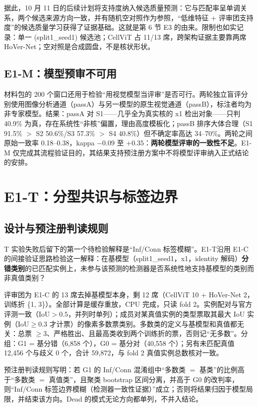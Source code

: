 \documentclass[11pt,a4paper,UTF8,fontset=fandol]{ctexart}
\begin{document}
据此，10 月 11 日的后续计划将支持度纳入候选质量预测：它与匹配率呈单调关系，两个候选来源方向一致，并有随机空对照作为参照，“低维特征 + 评审团支持度”的候选质量学习获得了证据基础。这就是第 6 节 E3 的由来。限制也如实记录：单一 (split1\_seed1) 候选池；CellViT 占 11/13 席，跨架构证据主要靠两席 HoVer-Net；空对照是合成圆盘，不是核状形状。

\subsection{E1-M：模型预审不可用}

材料包的 200 个窗口还用于检验“用视觉模型当评审”是否可行。两轮独立盲评分别使用图像分析通道（passA）与另一模型的原生视觉通道（passB），标注者均为非专家模型。结果：passA 对 S1——几乎全为真实核的 x1 检出对象——只判 40.9\% 为真，存在系统性“非核”偏置，理由高度模板化；passB 排序大体合理（S1 91.5\% $>$ S2 50.6\%/S3 57.3\% $>$ S4 40.8\%）但不确定率高达 34--70\%。两轮之间原始一致率 0.18--0.38，kappa $-0.09$ 至 $+0.35$：\textbf{两轮模型评审的一致性不足}。E1-M 仅完成其流程验证目的，其结果支持预注册方案中不将模型评审纳入正式结论的安排。

\section{E1-T：分型共识与标签边界}

\subsection{设计与预注册判读规则}

T 实验失败后留下的第一个待检验解释是“Inf/Conn 标签模糊”。E1-T\cite{specs}沿用 E1-C 的间接验证思路检验这一解释：在基模型（split1\_seed1，x1，identity 解码）\textbf{分错类别}的已匹配实例上，未参与该预测的检测器是否系统性地支持基模型的类别而非真值类别？

评审团为 E1-C 的 13 席去掉基模型本身，剩 12 席（CellViT 10 + HoVer-Net 2，训练折 \{1, 3\}）。全部计算是缓存重放，CPU 完成，只读 fold 2。实例配对与官方评测一致（IoU$>0.5$，并列时单列）；成员对某真值实例的类型票取其最大 IoU 实例（IoU$\geq0.3$ 才计票）的像素多数票类别。多数类的定义与基模型和真值都无关：总票 $\geq3$、严格胜出、且最高类收到两个训练折的票，否则记“无多数”。分组：G1 = 基分错（6,858 个），G0 = 基分对（40,558 个）；另有未匹配真值 12,456 个与歧义 0 个，合计 59,872，与 fold 2 真值实例总数核对一致。

预注册判读规则写明：若 G1 的 Inf/Conn 混淆组中“多数类 $=$ 基类”的比例高于“多数类 $=$ 真值类”，且聚类 bootstrap 区间分离，并高于 G0 的改判率，则“Inf/Conn 标签边界模糊（检测器一致性证据）”成立；否则将结果归因于模型局限，并结束该方向。Dead 的模式无论方向都单列，不并入结论。
\end{document}
